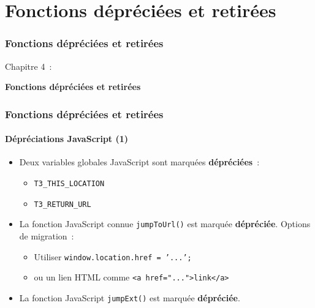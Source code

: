 %

\section{Fonctions dépréciées et retirées}
\begin{frame}[fragile]
	\frametitle{Fonctions dépréciées et retirées}

	\begin{center}\huge{Chapitre 4~:}\end{center}
	\begin{center}\huge{\color{typo3darkgrey}\textbf{Fonctions dépréciées et retirées}}\end{center}

\end{frame}


\begin{frame}[fragile]
	\frametitle{Fonctions dépréciées et retirées}
	\framesubtitle{Dépréciations JavaScript (1)}

	\begin{itemize}
		\item Deux variables globales JavaScript sont marquées \textbf{dépréciées}~:

			\begin{itemize}
				\item \texttt{T3\_THIS\_LOCATION}
				\item \texttt{T3\_RETURN\_URL}
			\end{itemize}

		\item La fonction JavaScript connue \texttt{jumpToUrl()} est marquée \textbf{dépréciée}.
			Options de migration~:

			\begin{itemize}
				\item Utiliser \texttt{window.location.href = '...';}
				\item ou un lien HTML comme \texttt{<a href="...">link</a>}
			\end{itemize}

		\item La fonction JavaScript \texttt{jumpExt()} est marquée \textbf{dépréciée}.

	\end{itemize}

\end{frame}


